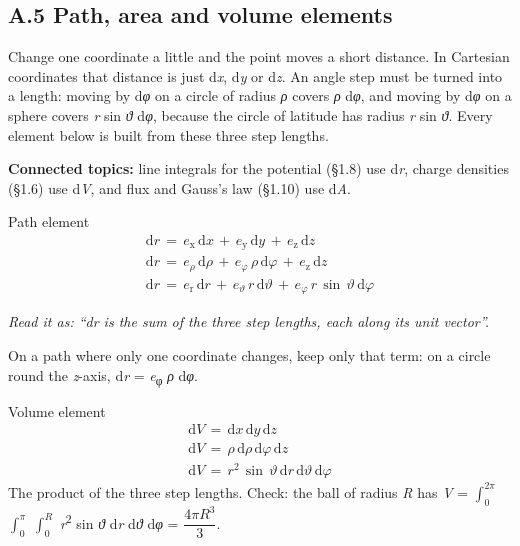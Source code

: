 \documentclass[11pt]{article}
\begin{document}
\begin{keepsection}
\section{A.5 Path, area and volume elements}

Change one coordinate a little and the point moves a short distance. In Cartesian coordinates that distance is just d\textit{x}, d\textit{y} or d\textit{z}. An angle step must be turned into a length: moving by d\textit{φ} on a circle of radius \textit{ρ} covers \textit{ρ} d\textit{φ}, and moving by d\textit{φ} on a sphere covers \textit{r} sin \textit{ϑ} d\textit{φ}, because the circle of latitude has radius \textit{r} sin \textit{ϑ}. Every element below is built from these three step lengths.

\textbf{Connected topics:} line integrals for the potential (§1.8) use d\textit{r}, charge densities (§1.6) use d\textit{V}, and flux and Gauss’s law (§1.10) use d\textit{A}.

\begin{equationcard}{Path element}
\[ \begin{gathered} \mathrm{d}{r}\, =\, {e}_{\mathrm{x}}\, \mathrm{d}{x}\, +\, {e}_{\mathrm{y}}\, \mathrm{d}{y}\, +\, {e}_{\mathrm{z}}\, \mathrm{d}{z} \\ \mathrm{d}{r}\, =\, {e}_{ρ}\, \mathrm{d}{ρ}\, +\, {e}_{φ}\, {ρ}\, \mathrm{d}{φ}\, +\, {e}_{\mathrm{z}}\, \mathrm{d}{z} \\ \mathrm{d}{r}\, =\, {e}_{\mathrm{r}}\, \mathrm{d}{r}\, +\, {e}_{ϑ}\, {r}\, \mathrm{d}{ϑ}\, +\, {e}_{φ}\, {r}\, \sin \, {ϑ}\, \mathrm{d}{φ} \end{gathered} \]
{\small \emph{Read it as: “dr is the sum of the three step lengths, each along its unit vector”.}\par On a path where only one coordinate changes, keep only that term: on a circle round the \textit{z}-axis, d\textit{r} = \textit{e}\textsubscript{φ} \textit{ρ} d\textit{φ}.}
\end{equationcard}

\begin{equationcard}{Volume element}
\[ \begin{gathered} \mathrm{d}{V}\, =\, \mathrm{d}{x}\, \mathrm{d}{y}\, \mathrm{d}{z} \\ \mathrm{d}{V}\, =\, {ρ}\, \mathrm{d}{ρ}\, \mathrm{d}{φ}\, \mathrm{d}{z} \\ \mathrm{d}{V}\, =\, {r}^{2}\, \sin \, {ϑ}\, \mathrm{d}{r}\, \mathrm{d}{ϑ}\, \mathrm{d}{φ} \end{gathered} \]
{\small The product of the three step lengths. Check: the ball of radius \textit{R} has \textit{V} = $\int_{0}^{2π} $ $\int_{0}^{π} $ $\int_{0}^{{R}} $ \textit{r}\textsuperscript{2} sin \textit{ϑ} d\textit{r} d\textit{ϑ} d\textit{φ} = {\small\ensuremath{\dfrac{4π{R}^{3}}{3}}}.}
\end{equationcard}


\end{keepsection}
\end{document}
